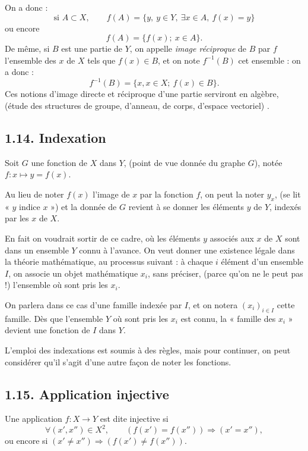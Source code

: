 On a donc :
\[
\text{si }A\subset X,\qquad f(A)=\{y,\ y\in Y,\ \exists x\in A,\ f(x)=y\}
\]
ou encore
\[
f(A)=\{f(x);\ x\in A\}.
\]
De même, si $B$ est une partie de $Y$, on appelle \emph{image réciproque} de $B$ par $f$ l'ensemble des $x$ de $X$ tels que $f(x)\in B$, et on note $f^{-1}(B)$ cet ensemble : on a donc :
\[
f^{-1}(B)=\{x,x\in X;\ f(x)\in B\}.
\]
Ces notions d'image directe et réciproque d'une partie serviront en algèbre, (étude des structures de groupe, d'anneau, de corps, d'espace vectoriel) .

\subsection*{1.14. Indexation}

Soit $G$ une fonction de $X$ dans $Y$, (point de vue donnée du graphe $G$), notée $f:x\mapsto y=f(x)$.

Au lieu de noter $f(x)$ l'image de $x$ par la fonction $f$, on peut la noter $y_x$, (se lit « $y$ indice $x$ ») et la donnée de $G$ revient à se donner les éléments $y$ de $Y$, indexés par les $x$ de $X$.

En fait on voudrait sortir de ce cadre, où les éléments $y$ associés aux $x$ de $X$ sont dans un ensemble $Y$ connu à l'avance. On veut donner une existence légale dans la théorie mathématique, au processus suivant : à chaque $i$ élément d'un ensemble $I$, on associe un objet mathématique $x_i$, sans préciser, (parce qu'on ne le peut pas !) l'ensemble où sont pris les $x_i$.

On parlera dans ce cas d'une famille indexée par $I$, et on notera $(x_i)_{i\in I}$ cette famille. Dès que l'ensemble $Y$ où sont pris les $x_i$ est connu, la « famille des $x_i$ » devient une fonction de $I$ dans $Y$.

L'emploi des indexations est soumis à des règles, mais pour continuer, on peut considérer qu'il s'agit d'une autre façon de noter les fonctions.


\subsection*{1.15. Application injective}
Une application $f:X\to Y$ est dite injective si
\[
\forall(x',x'')\in X^2,\qquad(f(x')=f(x''))\Rightarrow(x'=x''),
\]
ou encore si $(x'\ne x'')\Rightarrow(f(x')\ne f(x''))$.

